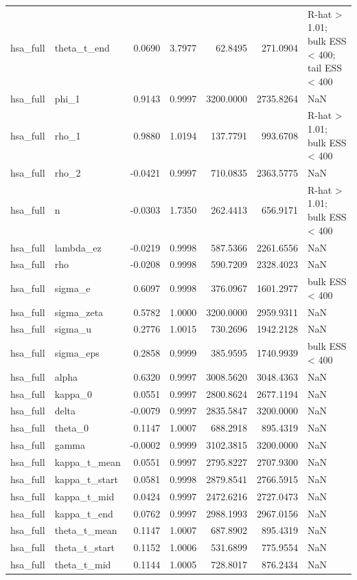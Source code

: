 \begin{tabular}{llrrrrl}
hsa\_full & theta\_t\_end & 0.0690 & 3.7977 & 62.8495 & 271.0904 & R-hat > 1.01; bulk ESS < 400; tail ESS < 400 \\
hsa\_full & phi\_1 & 0.9143 & 0.9997 & 3200.0000 & 2735.8264 & NaN \\
hsa\_full & rho\_1 & 0.9880 & 1.0194 & 137.7791 & 993.6708 & R-hat > 1.01; bulk ESS < 400 \\
hsa\_full & rho\_2 & -0.0421 & 0.9997 & 710.0835 & 2363.5775 & NaN \\
hsa\_full & n & -0.0303 & 1.7350 & 262.4413 & 656.9171 & R-hat > 1.01; bulk ESS < 400 \\
hsa\_full & lambda\_ez & -0.0219 & 0.9998 & 587.5366 & 2261.6556 & NaN \\
hsa\_full & rho & -0.0208 & 0.9998 & 590.7209 & 2328.4023 & NaN \\
hsa\_full & sigma\_e & 0.6097 & 0.9998 & 376.0967 & 1601.2977 & bulk ESS < 400 \\
hsa\_full & sigma\_zeta & 0.5782 & 1.0000 & 3200.0000 & 2959.9311 & NaN \\
hsa\_full & sigma\_u & 0.2776 & 1.0015 & 730.2696 & 1942.2128 & NaN \\
hsa\_full & sigma\_eps & 0.2858 & 0.9999 & 385.9595 & 1740.9939 & bulk ESS < 400 \\
hsa\_full & alpha & 0.6320 & 0.9997 & 3008.5620 & 3048.4363 & NaN \\
hsa\_full & kappa\_0 & 0.0551 & 0.9997 & 2800.8624 & 2677.1194 & NaN \\
hsa\_full & delta & -0.0079 & 0.9997 & 2835.5847 & 3200.0000 & NaN \\
hsa\_full & theta\_0 & 0.1147 & 1.0007 & 688.2918 & 895.4319 & NaN \\
hsa\_full & gamma & -0.0002 & 0.9999 & 3102.3815 & 3200.0000 & NaN \\
hsa\_full & kappa\_t\_mean & 0.0551 & 0.9997 & 2795.8227 & 2707.9300 & NaN \\
hsa\_full & kappa\_t\_start & 0.0581 & 0.9998 & 2879.8541 & 2766.5915 & NaN \\
hsa\_full & kappa\_t\_mid & 0.0424 & 0.9997 & 2472.6216 & 2727.0473 & NaN \\
hsa\_full & kappa\_t\_end & 0.0762 & 0.9997 & 2988.1993 & 2967.0156 & NaN \\
hsa\_full & theta\_t\_mean & 0.1147 & 1.0007 & 687.8902 & 895.4319 & NaN \\
hsa\_full & theta\_t\_start & 0.1152 & 1.0006 & 531.6899 & 775.9554 & NaN \\
hsa\_full & theta\_t\_mid & 0.1144 & 1.0005 & 728.8017 & 876.2434 & NaN \\

\end{tabular}

